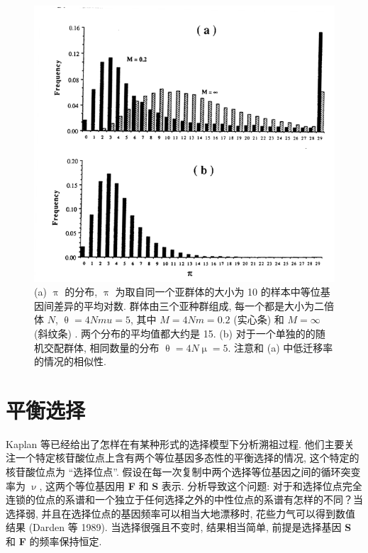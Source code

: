 \documentclass[12pt]{article}
\begin{document}
\begin{figure}
    \centering
    \includegraphics{coalescent-process.images/image7.png}
    \caption{
        (a) $\uppi$ 的分布, $\uppi$ 为取自同一个亚群体的大小为 10 的样本中等位基因间差异的平均对数. 群体由三个亚种群组成,
        每一个都是大小为二倍体 $N$, $\uptheta =4Nmu =5$, 其中 $M=4Nm=0.2$ (实心条) 和 $M=\mathrm{\infty}$ (斜纹条) .
        两个分布的平均值都大约是 15.
        (b) 对于一个单独的的随机交配群体, 相同数量的分布 $\uptheta =4N\upmu =5$. 注意和 (a) 中低迁移率的情况的相似性.
    }
    \label{fig:7}
\end{figure}

\section{平衡选择}

Kaplan 等已经给出了怎样在有某种形式的选择模型下分析溯祖过程.
他们主要关注一个特定核苷酸位点上含有两个等位基因多态性的平衡选择的情况, 这个特定的核苷酸位点为 ``选择位点''.
假设在每一次复制中两个选择等位基因之间的循环突变率为 $\upnu$, 这两个等位基因用 \textbf{F} 和 \textbf{S} 表示.
分析导致这个问题: 对于和选择位点完全连锁的位点的系谱和一个独立于任何选择之外的中性位点的系谱有怎样的不同？当选择弱,
并且在选择位点的基因频率可以相当大地漂移时, 花些力气可以得到数值结果 (Darden 等 1989). 当选择很强且不变时,
结果相当简单, 前提是选择基因 \textbf{S} 和 \textbf{F} 的频率保持恒定.
\end{document}
